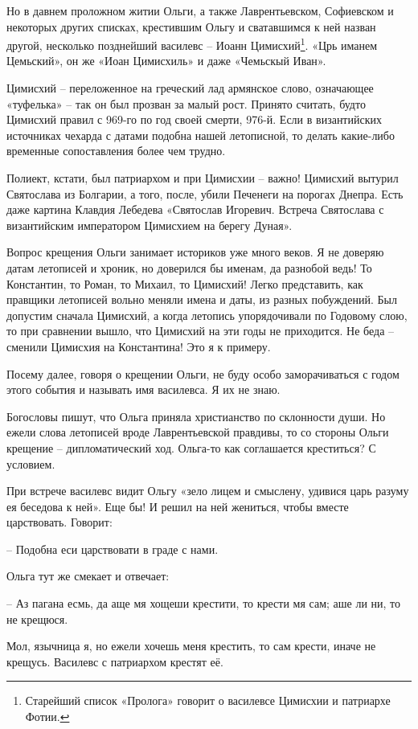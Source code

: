 Но в давнем проложном житии Ольги, а также Лаврентьевском, Софиевском и некоторых других списках, крестившим Ольгу и сватавшимся к ней назван другой, несколько позднейший василевс – Иоанн Цимисхий\footnote{Старейший список «Пролога» говорит о василевсе Цимисхии и патриархе Фотии.}. «Црь иманем Цемьский», он же «Иоан Цимисхиль» и даже «Чемьскый Иван». 

Цимисхий – переложенное на греческий лад армянское слово, означающее «туфелька» – так он был прозван за малый рост. Принято считать, будто Цимисхий правил с 969-го по год своей смерти, 976-й. Если в византийских источниках чехарда с датами подобна нашей летописной, то делать какие-либо временные сопоставления более чем трудно.

Полиект, кстати, был патриархом и при Цимисхии – важно! Цимисхий вытурил Святослава из Болгарии, а того, после, убили Печенеги на порогах Днепра. Есть даже картина Клавдия Лебедева «Святослав Игоревич. Встреча Святослава с византийским императором Цимисхием на берегу Дуная».

Вопрос крещения Ольги занимает историков уже много веков. Я не доверяю датам летописей и хроник, но доверился бы именам, да разнобой ведь! То Константин, то Роман, то Михаил, то Цимисхий! Легко представить, как правщики летописей вольно меняли имена и даты, из разных побуждений. Был допустим сначала Цимисхий, а когда летопись упорядочивали по Годовому слою, то при сравнении вышло, что Цимисхий на эти годы не приходится. Не беда – сменили Цимисхия на Константина! Это я к примеру.

Посему далее, говоря о крещении Ольги, не буду особо заморачиваться с годом этого события и называть имя василевса. Я их не знаю.

Богословы пишут, что Ольга приняла христианство по склонности души. Но ежели слова летописей вроде Лаврентьевской правдивы, то со стороны Ольги крещение – дипломатический ход. Ольга-то как соглашается креститься? С условием.

При встрече василевс видит Ольгу «зело лицем и смыслену, удивися царь разуму ея беседова к ней». Еще бы! И решил на ней жениться, чтобы вместе царствовать. Говорит: 

   – Подобна еси царствовати в граде с нами.

Ольга тут же смекает и отвечает:

   – Аз пагана есмь, да аще мя хощеши крестити, то крести мя сам; аше ли ни, то не крещюся.

Мол, язычница я, но ежели хочешь меня крестить, то сам крести, иначе не крещусь. Василевс с патриархом крестят её. 

